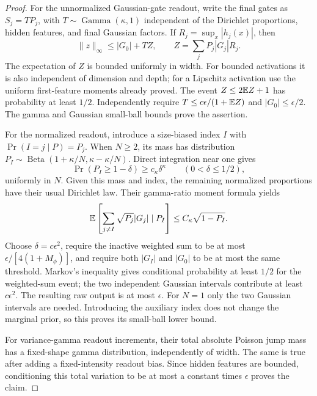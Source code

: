 \begin{proof}
For the unnormalized Gaussian-gate readout, write the final gates as
$S_j=T P_j$, with $T\sim\operatorname{Gamma}(\kappa,1)$ independent
of the Dirichlet proportions, hidden features, and final Gaussian
factors. If $R_j=\sup_x|h_j(x)|$, then
\[
 \|z\|_\infty\le|G_0|+T Z,
 \qquad Z=\sum_jP_j|G_j|R_j.
\]
The expectation of $Z$ is bounded uniformly in width. For bounded
activations it is also independent of dimension and depth; for a
Lipschitz activation use the uniform first-feature moments already
proved. The event $Z\le2\mathbb E Z+1$ has probability at least $1/2$.
Independently require $T\le c\epsilon/(1+\mathbb E Z)$ and
$|G_0|\le\epsilon/2$. The gamma and Gaussian small-ball bounds prove
the assertion.

For the normalized readout, introduce a size-biased index $I$ with
$\Pr(I=j\mid P)=P_j$. When $N\ge2$, its mass has distribution
$P_I\sim\operatorname{Beta}(1+\kappa/N,\kappa-\kappa/N)$.
Direct integration near one gives
\[
 \Pr(P_I\ge1-\delta)\ge c_\kappa\delta^\kappa
 \qquad(0<\delta\le1/2),
\]
uniformly in $N$. Given this mass and index, the remaining normalized
proportions have their usual Dirichlet law. Their gamma-ratio moment
formula yields
\[
 \mathbb E\left[\sum_{j\ne I}\sqrt{P_j}|G_j|
                       \mid P_I\right]
       \le C_\kappa\sqrt{1-P_I}.
\]
Choose $\delta=c\epsilon^2$, require the inactive weighted sum to be
at most $\epsilon/[4(1+M_\phi)]$, and require both $|G_I|$ and
$|G_0|$ to be at most the same threshold. Markov's inequality gives
conditional probability at least $1/2$ for the weighted-sum event;
the two independent Gaussian intervals contribute at least
$c\epsilon^2$. The resulting raw output is at most $\epsilon$.
For $N=1$ only the two Gaussian intervals are needed. Introducing the
auxiliary index does not change the marginal prior, so this proves its
small-ball lower bound.

For variance-gamma readout increments, their total absolute Poisson
jump mass has a fixed-shape gamma distribution, independently of width.
The same is true after adding a fixed-intensity readout bias. Since
hidden features are bounded, conditioning this total variation to be
at most a constant times $\epsilon$ proves the claim.
\end{proof}

